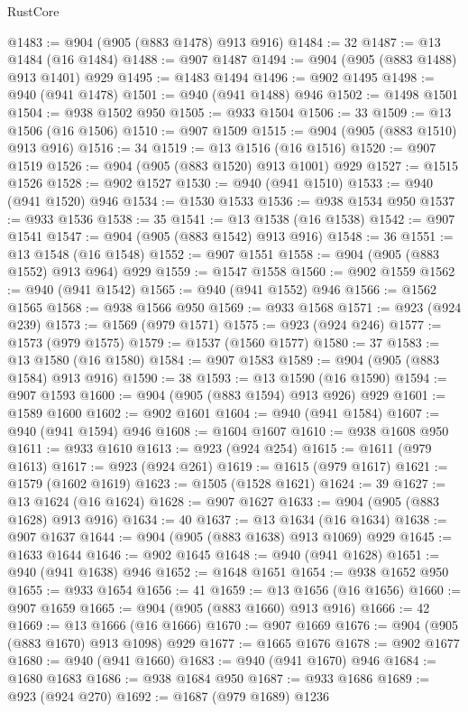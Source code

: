 \begin{lexlean}{RustCore}
\begin{coremodule}
@1483 := @904 (@905 (@883 @1478) @913 @916)
@1484 := 32
@1487 := @13 @1484 (@16 @1484)
@1488 := @907 @1487
@1494 := @904 (@905 (@883 @1488) @913 @1401) @929
@1495 := @1483 @1494
@1496 := @902 @1495
@1498 := @940 (@941 @1478)
@1501 := @940 (@941 @1488) @946
@1502 := @1498 @1501
@1504 := @938 @1502 @950
@1505 := @933 @1504
@1506 := 33
@1509 := @13 @1506 (@16 @1506)
@1510 := @907 @1509
@1515 := @904 (@905 (@883 @1510) @913 @916)
@1516 := 34
@1519 := @13 @1516 (@16 @1516)
@1520 := @907 @1519
@1526 := @904 (@905 (@883 @1520) @913 @1001) @929
@1527 := @1515 @1526
@1528 := @902 @1527
@1530 := @940 (@941 @1510)
@1533 := @940 (@941 @1520) @946
@1534 := @1530 @1533
@1536 := @938 @1534 @950
@1537 := @933 @1536
@1538 := 35
@1541 := @13 @1538 (@16 @1538)
@1542 := @907 @1541
@1547 := @904 (@905 (@883 @1542) @913 @916)
@1548 := 36
@1551 := @13 @1548 (@16 @1548)
@1552 := @907 @1551
@1558 := @904 (@905 (@883 @1552) @913 @964) @929
@1559 := @1547 @1558
@1560 := @902 @1559
@1562 := @940 (@941 @1542)
@1565 := @940 (@941 @1552) @946
@1566 := @1562 @1565
@1568 := @938 @1566 @950
@1569 := @933 @1568
@1571 := @923 (@924 @239)
@1573 := @1569 (@979 @1571)
@1575 := @923 (@924 @246)
@1577 := @1573 (@979 @1575)
@1579 := @1537 (@1560 @1577)
@1580 := 37
@1583 := @13 @1580 (@16 @1580)
@1584 := @907 @1583
@1589 := @904 (@905 (@883 @1584) @913 @916)
@1590 := 38
@1593 := @13 @1590 (@16 @1590)
@1594 := @907 @1593
@1600 := @904 (@905 (@883 @1594) @913 @926) @929
@1601 := @1589 @1600
@1602 := @902 @1601
@1604 := @940 (@941 @1584)
@1607 := @940 (@941 @1594) @946
@1608 := @1604 @1607
@1610 := @938 @1608 @950
@1611 := @933 @1610
@1613 := @923 (@924 @254)
@1615 := @1611 (@979 @1613)
@1617 := @923 (@924 @261)
@1619 := @1615 (@979 @1617)
@1621 := @1579 (@1602 @1619)
@1623 := @1505 (@1528 @1621)
@1624 := 39
@1627 := @13 @1624 (@16 @1624)
@1628 := @907 @1627
@1633 := @904 (@905 (@883 @1628) @913 @916)
@1634 := 40
@1637 := @13 @1634 (@16 @1634)
@1638 := @907 @1637
@1644 := @904 (@905 (@883 @1638) @913 @1069) @929
@1645 := @1633 @1644
@1646 := @902 @1645
@1648 := @940 (@941 @1628)
@1651 := @940 (@941 @1638) @946
@1652 := @1648 @1651
@1654 := @938 @1652 @950
@1655 := @933 @1654
@1656 := 41
@1659 := @13 @1656 (@16 @1656)
@1660 := @907 @1659
@1665 := @904 (@905 (@883 @1660) @913 @916)
@1666 := 42
@1669 := @13 @1666 (@16 @1666)
@1670 := @907 @1669
@1676 := @904 (@905 (@883 @1670) @913 @1098) @929
@1677 := @1665 @1676
@1678 := @902 @1677
@1680 := @940 (@941 @1660)
@1683 := @940 (@941 @1670) @946
@1684 := @1680 @1683
@1686 := @938 @1684 @950
@1687 := @933 @1686
@1689 := @923 (@924 @270)
@1692 := @1687 (@979 @1689) @1236

\end{coremodule}
\end{lexlean}
